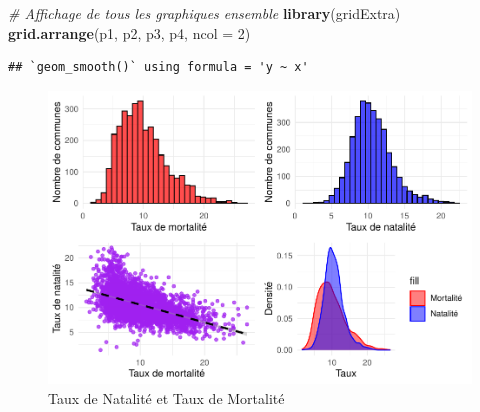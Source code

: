 \documentclass[
]{article}
\newenvironment{Shaded}{\begin{snugshade}}{\end{snugshade}}
\newcommand{\AttributeTok}[1]{\textcolor[rgb]{0.13,0.29,0.53}{#1}}
\newcommand{\CommentTok}[1]{\textcolor[rgb]{0.56,0.35,0.01}{\textit{#1}}}
\newcommand{\DecValTok}[1]{\textcolor[rgb]{0.00,0.00,0.81}{#1}}
\newcommand{\FunctionTok}[1]{\textcolor[rgb]{0.13,0.29,0.53}{\textbf{#1}}}
\newcommand{\NormalTok}[1]{#1}
\begin{document}
\begin{Shaded}
\begin{Highlighting}[]
\CommentTok{\#  Affichage de tous les graphiques ensemble}
\FunctionTok{library}\NormalTok{(gridExtra)}
\FunctionTok{grid.arrange}\NormalTok{(p1, p2, p3, p4, }\AttributeTok{ncol =} \DecValTok{2}\NormalTok{)}
\end{Highlighting}
\end{Shaded}

\begin{verbatim}
## `geom_smooth()` using formula = 'y ~ x'
\end{verbatim}

\begin{figure}

{\centering \includegraphics{4_Analyse_Descriptive_files/figure-latex/unnamed-chunk-6-1} 

}

\caption{Taux de Natalité et Taux de Mortalité}\label{fig:unnamed-chunk-6}
\end{figure}
\end{document}
